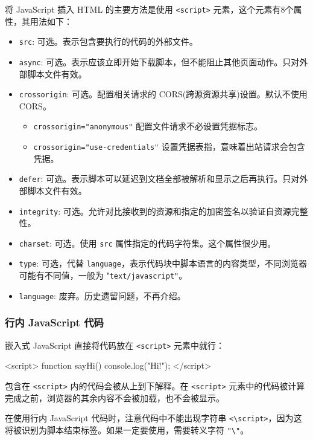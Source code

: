 将 JavaScript 插入 HTML 的主要方法是使用 \texttt{<script>} 元素，这个元素有8个属性，其用法如下：
\begin{itemize}
    \item \texttt{src}: 可选。表示包含要执行的代码的外部文件。
    \item \texttt{async}: 可选。表示应该立即开始下载脚本，但不能阻止其他页面动作。只对外部脚本文件有效。
    \item \texttt{crossorigin}: 可选。配置相关请求的 CORS(跨源资源共享)设置。默认不使用 CORS。
    \begin{itemize}
        \item \texttt{crossorigin="anonymous"} 配置文件请求不必设置凭据标志。
        \item \texttt{crossorigin="use-credentials"} 设置凭据表指，意味着出站请求会包含凭据。
    \end{itemize}
    \item \texttt{defer}: 可选。表示脚本可以延迟到文档全部被解析和显示之后再执行。只对外部脚本文件有效。
    \item \texttt{integrity}: 可选。允许对比接收到的资源和指定的加密签名以验证自资源完整性。
    \item \texttt{charset}: 可选。使用 \texttt{src} 属性指定的代码字符集。这个属性很少用。
    \item \texttt{type}: 可选，代替 \texttt{language}，表示代码块中脚本语言的内容类型，不同浏览器可能有不同值，一般为 "\texttt{text/javascript"}。
    \item \texttt{language}: 废弃。历史遗留问题，不再介绍。
\end{itemize}

\subsubsection*{行内 JavaScript 代码}

嵌入式 JavaScript 直接将代码放在 \texttt{<script>} 元素中就行：

\begin{HTML}
<script>
    function sayHi() {
        console.log("Hi!");
    }
</script>
\end{HTML}

包含在 \texttt{<script>} 内的代码会被从上到下解释。在  \texttt{<script>} 元素中的代码被计算完成之前，浏览器的其余内容不会被加载，也不会被显示。

在使用行内 JavaScript 代码时，注意代码中不能出现字符串  \texttt{<\textbackslash script>}，因为这将被识别为脚本结束标签。如果一定要使用，需要转义字符 \texttt{"\textbackslash"}。

